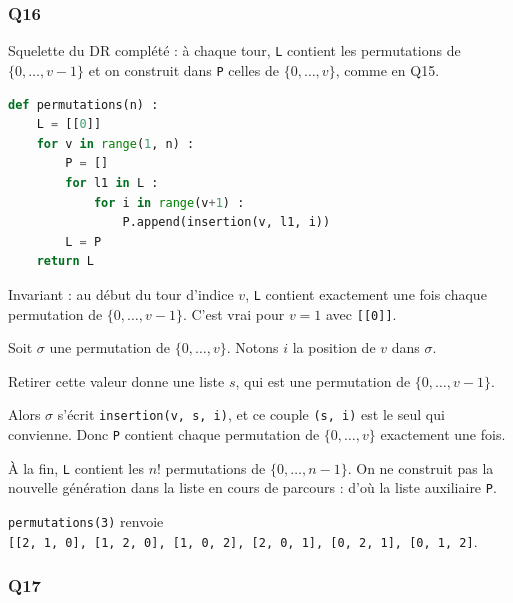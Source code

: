 \documentclass[11pt,a4paper]{article}
\begin{document}
\hypertarget{q16}{%
\subsubsection{Q16}\label{q16}}

Squelette du DR complété : à chaque tour, \texttt{L} contient les permutations de \(\{0, \dots, v-1\}\) et on construit dans \texttt{P} celles de \(\{0, \dots, v\}\), comme en Q15.

\begin{lstlisting}[language=Python]
def permutations(n) :
    L = [[0]]
    for v in range(1, n) :
        P = []
        for l1 in L :
            for i in range(v+1) :
                P.append(insertion(v, l1, i))
        L = P
    return L
\end{lstlisting}

Invariant : au début du tour d'indice \(v\), \texttt{L} contient exactement une fois chaque permutation de \(\{0, \dots, v-1\}\). C'est vrai pour \(v = 1\) avec \texttt{{[}{[}0{]}{]}}.

Soit \(\sigma\) une permutation de \(\{0, \dots, v\}\). Notons \(i\) la position de \(v\) dans \(\sigma\).

Retirer cette valeur donne une liste \(s\), qui est une permutation de \(\{0, \dots, v-1\}\).

Alors \(\sigma\) s'écrit \texttt{insertion(\allowbreak{}v,\allowbreak{}\ s,\allowbreak{}\ i)\allowbreak{}}, et ce couple \texttt{(s,\ i)} est le seul qui convienne. Donc \texttt{P} contient chaque permutation de \(\{0, \dots, v\}\) exactement une fois.

À la fin, \texttt{L} contient les \(n!\) permutations de \(\{0, \dots, n-1\}\). On ne construit pas la nouvelle génération dans la liste en cours de parcours : d'où la liste auxiliaire \texttt{P}.

\texttt{permutations(3)} renvoie \texttt{{[}{[}2,\allowbreak{}\ 1,\allowbreak{}\ 0{]}\allowbreak{},\allowbreak{}\ {[}1,\allowbreak{}\ 2,\allowbreak{}\ 0{]}\allowbreak{},\allowbreak{}\ {[}1,\allowbreak{}\ 0,\allowbreak{}\ 2{]}\allowbreak{},\allowbreak{}\ {[}2,\allowbreak{}\ 0,\allowbreak{}\ 1{]}\allowbreak{},\allowbreak{}\ {[}0,\allowbreak{}\ 2,\allowbreak{}\ 1{]}\allowbreak{},\allowbreak{}\ {[}0,\allowbreak{}\ 1,\allowbreak{}\ 2{]}\allowbreak{}{]}\allowbreak{}}.

\hypertarget{q17}{%
\subsubsection{Q17}\label{q17}}
\end{document}
